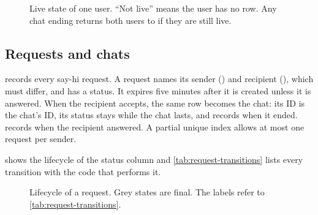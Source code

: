 \begin{figure}[ht]
  \centering
  
  \caption{Live state of one user. ``Not live'' means the user has no  row. Any chat
    ending returns both users to  if they are still live.}
  \label{fig:live-states}
\end{figure}

\subsection{Requests and chats}

 records every say-hi request. A request names its sender () and
recipient (), which must differ, and has a status. It expires five minutes after it is
created unless it is answered. When the recipient accepts, the same row becomes the chat: its ID is the
chat's ID, its status stays  while the chat lasts, and  records when it
ended.  records when the recipient answered. A partial unique index allows at most one
 request per sender.

 shows the lifecycle of the status column and \cref{tab:request-transitions}
lists every transition with the code that performs it.

\begin{figure}[ht]
  \centering
  
  \caption{Lifecycle of a request. Grey states are final. The labels refer to
    \cref{tab:request-transitions}.}
  \label{fig:request-states}
\end{figure}

